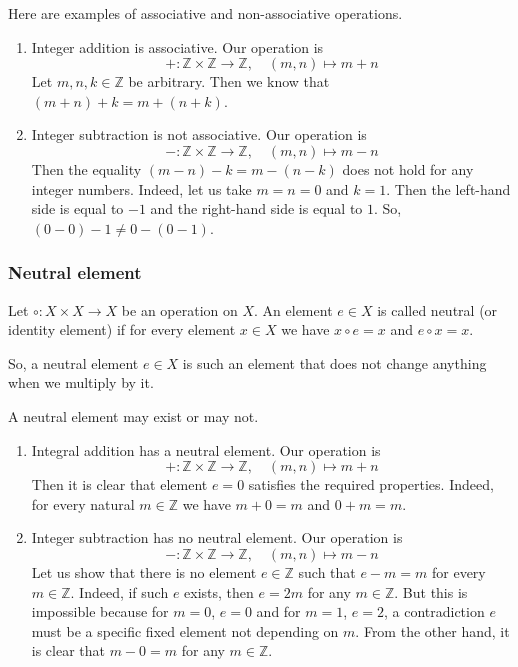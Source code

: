 \begin{examples}
Here are examples of associative and non-associative operations.
\begin{enumerate}
\item Integer addition is associative.
Our operation is
\[
+\colon \mathbb Z\times \mathbb Z\to \mathbb Z,\quad (m,n)\mapsto m+n
\]
Let $m,n,k\in \mathbb Z$ be arbitrary.
Then we know that $(m + n) + k = m + (n + k)$.

\item Integer subtraction is not associative.
Our operation is
\[
-\colon \mathbb Z\times \mathbb Z\to \mathbb Z,\quad (m,n)\mapsto m-n
\]
Then the equality $(m - n) - k = m - (n - k)$ does not hold for any integer numbers.
Indeed, let us take $m = n = 0$ and $k = 1$.
Then the left-hand side is equal to $-1$ and the right-hand side is equal to $1$.
So, $(0 - 0) - 1 \neq 0 - (0 - 1)$.
\end{enumerate}
\end{examples}

\subsubsection{Neutral element}

\begin{definition}
Let $\circ \colon X\times X\to X$ be an operation on $X$.
An element $e\in X$ is called neutral (or identity element) if for every element $x\in X$ we have $x\circ e = x$ and $e \circ x = x$.
\end{definition}

So, a neutral element $e\in X$ is such an element that does not change anything when we multiply by it.

\begin{examples}
A neutral element may exist or may not.
\begin{enumerate}
\item Integral addition has a neutral element.
Our operation is
\[
+\colon \mathbb Z\times \mathbb Z\to \mathbb Z,\quad (m,n)\mapsto m+n
\]
Then it is clear that element $e = 0$ satisfies the required properties.
Indeed, for every natural $m\in \mathbb Z$ we have $m + 0 = m$ and $0 + m = m$.

\item Integer subtraction has no neutral element.
Our operation is
\[
-\colon \mathbb Z\times \mathbb Z\to \mathbb Z,\quad (m,n)\mapsto m-n
\]
Let us show that there is no element $e\in \mathbb Z$ such that $e - m = m$ for every $m\in \mathbb Z$.
Indeed, if such $e$ exists, then $e = 2m$ for any $m\in \mathbb Z$.
But this is impossible because for $m = 0$, $e = 0$ and for $m = 1$, $e = 2$, a contradiction $e$ must be a specific fixed element not depending on $m$.
From the other hand, it is clear that $m - 0 = m$ for any $m\in \mathbb Z$.
\end{enumerate}
\end{examples}

